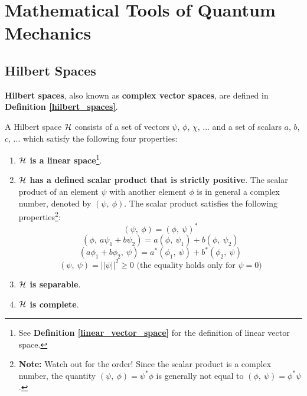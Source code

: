 \section{Mathematical Tools of Quantum Mechanics}

\subsection{Hilbert Spaces}

\textbf{Hilbert spaces}, also known as \textbf{complex vector spaces}, are defined in \textbf{Definition \ref{hilbert_spaces}}.

\begin{definition} \label{hilbert_spaces}
    A Hilbert space $\mathcal{H}$ consists of a set of vectors $\psi$, $\phi$, $\chi$, ... and a set of scalars $a$, $b$, $c$, ... which satisfy the following four properties:

    \begin{enumerate}
        \item \textbf{$\mathcal{H}$ is a linear space}\footnote{See \textbf{Definition \ref{linear_vector_space}} for the definition of linear vector space.}.
        \item \textbf{$\mathcal{H}$ has a defined scalar product that is strictly positive}. The scalar product of an element $\psi$ with another element $\phi$ is in general a complex number, denoted by $(\psi,\ \phi)$. The scalar product satisfies the following properties\footnote{\textbf{Note:} Watch out for the order! Since the scalar product is a complex number, the quantity $(\psi,\ \phi) = \psi^*\phi$ is generally not equal to $(\phi,\ \psi) = \phi^*\psi$.}:
        \begin{equation}
            (\psi,\ \phi) = (\phi,\ \psi)^*
        \end{equation}
        \begin{equation}
            (\phi,\ a\psi_1 + b\psi_2) = a(\phi,\ \psi_1) + b(\phi,\ \psi_2)
        \end{equation}
        \begin{equation}
            (a\phi_1 + b\phi_2,\ \psi) = a^*(\phi_1,\ \psi) + b^*(\phi_2,\ \psi)
        \end{equation}
        \begin{equation}
            (\psi,\ \psi) = ||\psi||^2 \geq 0 \text{ (the equality holds only for } \psi = 0\text{)}
        \end{equation}
        \item \textbf{$\mathcal{H}$ is separable}.
        \item \textbf{$\mathcal{H}$ is complete}.
    \end{enumerate}
\end{definition}

